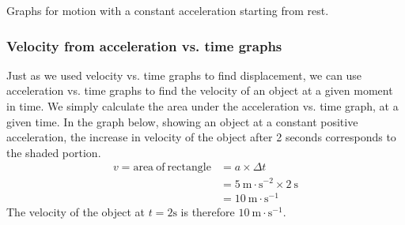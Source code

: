 \begin{center}
% 
% 
% 
% 
% 
% 
% 
\vspace{\baselineskip}
\caption{Graphs for motion with a constant acceleration starting from rest.}
\label{fig:pr:acceleration:uniform}
\end{center}

        \label{m38795*uid115}
\subsubsection*{Velocity from acceleration vs. time graphs}
            \nopagebreak
          \label{m38795*id72754}Just as we used velocity vs. time graphs to find displacement, we can use acceleration vs. time graphs to find the velocity of an object at a given moment in time. We simply calculate the area under the acceleration vs. time graph, at a given time. In the graph below, showing an object at a constant positive acceleration, the increase in velocity of the object after 2 seconds corresponds to the shaded portion.   
    \begin{align*}
    v=\text{area}~\text{of}~\text{rectangle}&= a\ensuremath{\times}\Delta t\\ 
      &= 5~\text{m}\ensuremath{\cdot}{\text{s}}^{-2}\ensuremath{\times}2~\text{s}\\ 
      &= 10~\text{m}\ensuremath{\cdot}{\text{s}}^{-1}
      \end{align*}
          \label{m38795*id72897}The velocity of the object at $t=2\text{s}$ is therefore $10~\text{m}\ensuremath{\cdot}\text{s}{}^{-1}$. %
    \label{m38795*cid8}
